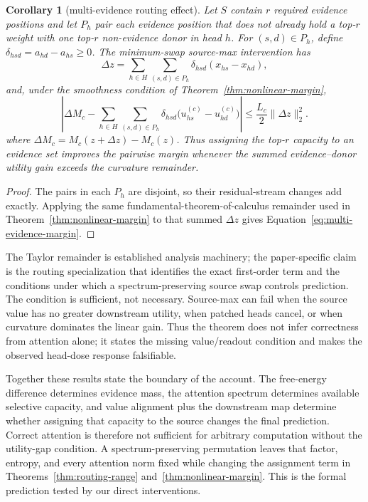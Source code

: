 \documentclass[letterpaper]{article} %
\newtheorem{corollary}[proposition]{Corollary}
\begin{document}
\begin{corollary}[multi-evidence routing effect]
\label{cor:multi-evidence}
Let $S$ contain $r$ required evidence positions and let $P_h$ pair each evidence position that does not
already hold a top-$r$ weight with one top-$r$ non-evidence donor in head $h$.
For $(s,d)\in P_h$, define $\delta_{hsd}=a_{hd}-a_{hs}\ge0$.
The minimum-swap source-max intervention has
\begin{equation}
\Delta z=\sum_{h\in H}\sum_{(s,d)\in P_h}
\delta_{hsd}(x_{hs}-x_{hd}),
\end{equation}
and, under the smoothness condition of Theorem~\ref{thm:nonlinear-margin},
\begin{equation}
\left|\Delta M_c-\sum_{h\in H}\sum_{(s,d)\in P_h}
\delta_{hsd}\big(u_{hs}^{(c)}-u_{hd}^{(c)}\big)\right|
\le \frac{L_c}{2}\lVert\Delta z\rVert_2^2.
\label{eq:multi-evidence-margin}
\end{equation}
where $\Delta M_c=M_c(z+\Delta z)-M_c(z)$.
Thus assigning the top-$r$ capacity to an evidence set improves the pairwise margin whenever the summed
evidence--donor utility gain exceeds the curvature remainder.
\end{corollary}

\begin{proof}
The pairs in each $P_h$ are disjoint, so their residual-stream changes add exactly.
Applying the same fundamental-theorem-of-calculus remainder used in
Theorem~\ref{thm:nonlinear-margin} to that summed $\Delta z$ gives
Equation~\ref{eq:multi-evidence-margin}.
\end{proof}

The Taylor remainder is established analysis machinery; the paper-specific claim is the routing
specialization that identifies the exact first-order term and the conditions under which a
spectrum-preserving source swap controls prediction. The condition is sufficient, not necessary.
Source-max can fail when the source value has no greater downstream utility, when patched heads cancel, or
when curvature dominates the linear gain. Thus the theorem does not infer correctness from attention alone;
it states the missing value/readout condition and makes the observed head-dose response falsifiable.

Together these results state the boundary of the account.
The free-energy difference determines evidence mass, the attention spectrum determines available selective
capacity, and value alignment plus the downstream map determine whether assigning that capacity to the
source changes the final prediction.
Correct attention is therefore not sufficient for arbitrary computation without the utility-gap condition.
A spectrum-preserving permutation leaves that factor, entropy, and every attention norm fixed while changing
the assignment term in Theorems~\ref{thm:routing-range} and~\ref{thm:nonlinear-margin}.
This is the formal prediction tested by our direct interventions.
\end{document}
